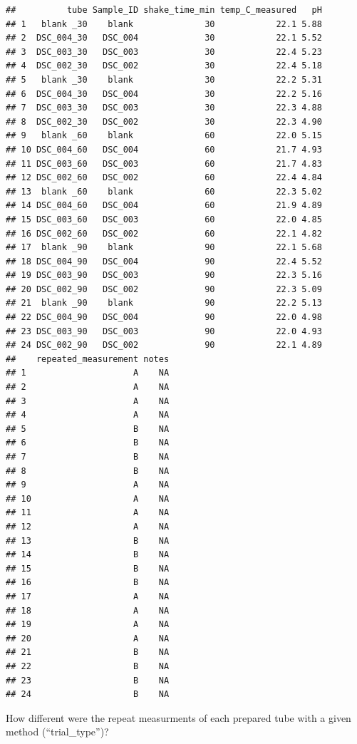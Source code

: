 \documentclass[
]{article}
\begin{document}
\begin{verbatim}
##          tube Sample_ID shake_time_min temp_C_measured   pH
## 1   blank _30    blank              30            22.1 5.88
## 2  DSC_004_30   DSC_004             30            22.1 5.52
## 3  DSC_003_30   DSC_003             30            22.4 5.23
## 4  DSC_002_30   DSC_002             30            22.4 5.18
## 5   blank _30    blank              30            22.2 5.31
## 6  DSC_004_30   DSC_004             30            22.2 5.16
## 7  DSC_003_30   DSC_003             30            22.3 4.88
## 8  DSC_002_30   DSC_002             30            22.3 4.90
## 9   blank _60    blank              60            22.0 5.15
## 10 DSC_004_60   DSC_004             60            21.7 4.93
## 11 DSC_003_60   DSC_003             60            21.7 4.83
## 12 DSC_002_60   DSC_002             60            22.4 4.84
## 13  blank _60    blank              60            22.3 5.02
## 14 DSC_004_60   DSC_004             60            21.9 4.89
## 15 DSC_003_60   DSC_003             60            22.0 4.85
## 16 DSC_002_60   DSC_002             60            22.1 4.82
## 17  blank _90    blank              90            22.1 5.68
## 18 DSC_004_90   DSC_004             90            22.4 5.52
## 19 DSC_003_90   DSC_003             90            22.3 5.16
## 20 DSC_002_90   DSC_002             90            22.3 5.09
## 21  blank _90    blank              90            22.2 5.13
## 22 DSC_004_90   DSC_004             90            22.0 4.98
## 23 DSC_003_90   DSC_003             90            22.0 4.93
## 24 DSC_002_90   DSC_002             90            22.1 4.89
##    repeated_measurement notes
## 1                     A    NA
## 2                     A    NA
## 3                     A    NA
## 4                     A    NA
## 5                     B    NA
## 6                     B    NA
## 7                     B    NA
## 8                     B    NA
## 9                     A    NA
## 10                    A    NA
## 11                    A    NA
## 12                    A    NA
## 13                    B    NA
## 14                    B    NA
## 15                    B    NA
## 16                    B    NA
## 17                    A    NA
## 18                    A    NA
## 19                    A    NA
## 20                    A    NA
## 21                    B    NA
## 22                    B    NA
## 23                    B    NA
## 24                    B    NA
\end{verbatim}

How different were the repeat measurments of each prepared tube with a
given method (``trial\_type'')?
\end{document}

